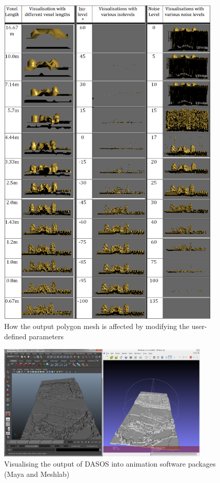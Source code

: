 \documentclass{subfiles}
\begin{document}
  
  \begin{figure} [h!]
  	\centering
  	\includegraphics[width=0.95\textwidth]{img/SwitchingParameters}
  	\caption[Polygonisation Parameters]{How the output polygon mesh is affected by modifying the user-defined parameters}
  	\label{fig:SwitchingVisParameters}
  \end{figure}
  
   \begin{figure} [h!]
	   	\centering
    	\includegraphics[width=0.9\textwidth]{img/AimationPackages.png}
     	\caption[Animation Packages]{Visualising the output of DASOS into animation software packages (Maya and Meshlab)}
     	\label{fig:AnimationPackages}
    \end{figure}
  
\end{document}

